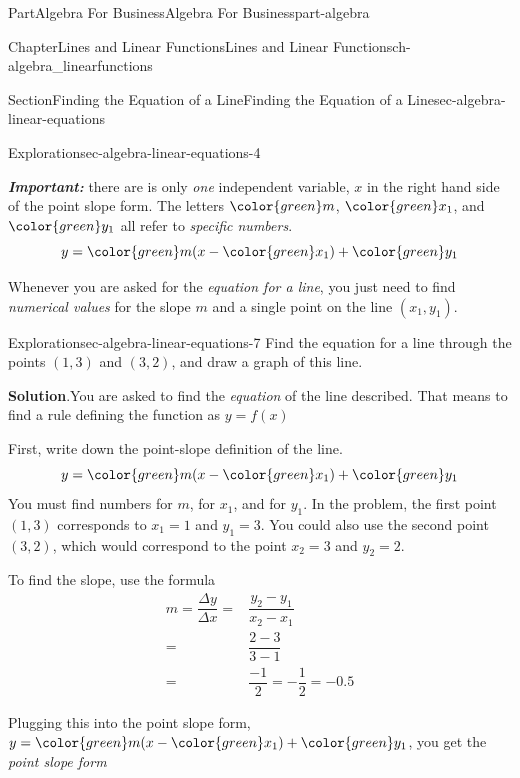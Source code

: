 \documentclass{tufte-book}
\newcommand{\blocktitlefont}{\relax}
\newcommand{\alert}[1]{\textbf{\textit{#1}}}
\numberwithin{equation}{chapter}
\newcommand{\amp}{&}
\begin{document}
\begin{partptx}{Part}{Algebra For Business}{}{Algebra For Business}{}{}{part-algebra}
\begin{chapterptx}{Chapter}{Lines and Linear Functions}{}{Lines and Linear Functions}{}{}{ch-algebra_linearfunctions}
\begin{sectionptx}{Section}{Finding the Equation of a Line}{}{Finding the Equation of a Line}{}{}{sec-algebra-linear-equations}
\begin{exploration}{Exploration}{}{sec-algebra-linear-equations-4}
\begin{image}{0.25}{0.5}{0.25}{}
{
}%
\end{image}%
\end{exploration}%
\alert{Important:} there are is only \emph{one} independent variable, \(x\) in the right hand side of the point slope form. The letters \(\color{green} m\), \(\color{green} x_1\), and \(\color{green} y_1\) all refer to \emph{specific numbers}.%
\begin{equation*}
y = {\color{green} m} (x - { \color{green} x_1}) + {\color{green} y_1}
\end{equation*}
%
\par
Whenever you are asked for the \emph{equation for a line}, you just need to find \emph{numerical values} for the slope \(m\) and a single point on the line \((x_1,y_1)\).%
\begin{exploration}{Exploration}{}{sec-algebra-linear-equations-7}%
Find the equation for a line through the points \((1,3)\) and \((3,2)\), and draw a graph of this line.%
\par\smallskip%
\noindent\textbf{\blocktitlefont Solution}.\hypertarget{sec-algebra-linear-equations-7-2}{}\quad{}You are asked to find the \emph{equation} of the line described. That means to find a rule defining the function as \(y = f(x)\)%
\par
First, write down the point-slope definition of the line.%
\begin{equation*}
y = {\color{green} m} (x - { \color{green} x_1}) + {\color{green} y_1}
\end{equation*}
You must find numbers for \(m\), for \(x_1\), and for \(y_1\). In the problem, the first point \((1,3)\) corresponds to \(x_1=1\) and \(y_1=3\).  You could also use the second point \((3,2)\), which would correspond to the point \(x_2=3\) and \(y_2 = 2\).%
\par
To find the slope, use the formula%
\begin{align*}
m = \dfrac{\Delta y}{\Delta x} = \amp \dfrac{y_2-y_1}{x_2-x_1}\\
= \amp \dfrac{2-3}{3-1}\\
= \amp \dfrac {-1}{2} = - \dfrac{1}{2} = -0.5 
\end{align*}
%
\par
Plugging this into the point slope form, \(y = {\color{green} m} (x - { \color{green} x_1}) + {\color{green} y_1}\), you get the \emph{point slope form}%

\end{exploration}
\end{sectionptx}
\end{chapterptx}
\end{partptx}
\end{document}
